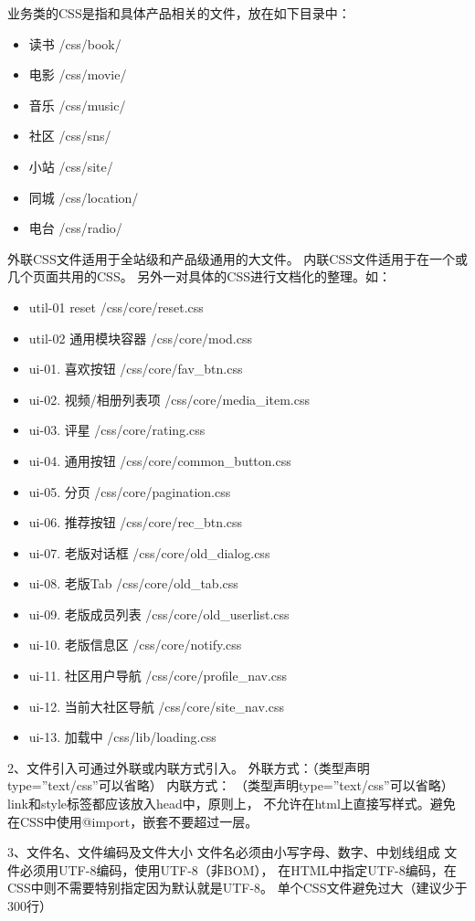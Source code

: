 \documentclass{book}
\begin{document}
业务类的CSS是指和具体产品相关的文件，放在如下目录中：
\begin{itemize}
\item{读书 /css/book/}
\item{电影 /css/movie/}
\item{音乐 /css/music/}
\item{社区 /css/sns/}
\item{小站 /css/site/}
\item{同城 /css/location/}
\item{电台 /css/radio/}
\end{itemize}

外联CSS文件适用于全站级和产品级通用的大文件。
内联CSS文件适用于在一个或几个页面共用的CSS。
另外一对具体的CSS进行文档化的整理。如：

\begin{itemize}
\item{util-01 reset /css/core/reset.css}
\item{util-02 通用模块容器 /css/core/mod.css}
\item{ui-01. 喜欢按钮 /css/core/fav\_btn.css}
\item{ui-02. 视频/相册列表项 /css/core/media\_item.css}
\item{ui-03. 评星 /css/core/rating.css}
\item{ui-04. 通用按钮 /css/core/common\_button.css}
\item{ui-05. 分页 /css/core/pagination.css}
\item{ui-06. 推荐按钮 /css/core/rec\_btn.css}
\item{ui-07. 老版对话框 /css/core/old\_dialog.css}
\item{ui-08. 老版Tab /css/core/old\_tab.css}
\item{ui-09. 老版成员列表 /css/core/old\_userlist.css}
\item{ui-10. 老版信息区 /css/core/notify.css}
\item{ui-11. 社区用户导航 /css/core/profile\_nav.css}
\item{ui-12. 当前大社区导航 /css/core/site\_nav.css}
\item{ui-13. 加载中 /css/lib/loading.css}
\end{itemize}

2、文件引入可通过外联或内联方式引入。
外联方式：（类型声明type=”text/css”可以省略）
内联方式： （类型声明type=”text/css”可以省略）
link和style标签都应该放入head中，原则上，
不允许在html上直接写样式。避免在CSS中使用@import，嵌套不要超过一层。

3、文件名、文件编码及文件大小
文件名必须由小写字母、数字、中划线组成
文件必须用UTF-8编码，使用UTF-8（非BOM），
在HTML中指定UTF-8编码，在CSS中则不需要特别指定因为默认就是UTF-8。
单个CSS文件避免过大（建议少于300行）
\end{document}
